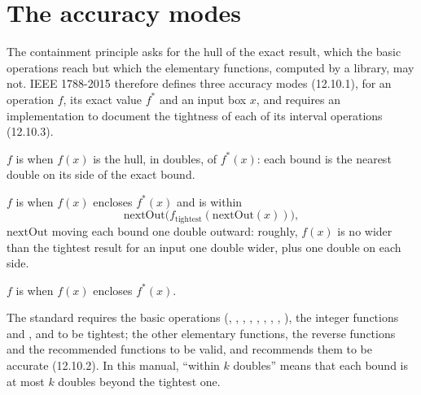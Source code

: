 \section{The accuracy modes}\label{sec:accuracy-modes}
%
%

The containment principle asks for the hull of the exact result, which the
basic operations reach but which the elementary functions, computed by a
library, may not. IEEE 1788-2015 therefore defines three accuracy modes
(12.10.1), for an operation $f$, its exact value $f^*$ and an input box
$x$, and requires an implementation to document the tightness of each of
its interval operations (12.10.3).

\begin{Def}[Tightest]\label{def:tightest}
$f$ is  when $f(x)$ is the hull, in doubles, of $f^*(x)$:
each bound is the nearest double on its side of the exact bound.
\end{Def}

\begin{Def}[Accurate]\label{def:accurate}
$f$ is  when $f(x)$ encloses $f^*(x)$ and is within
\begin{equation*}
  \mathrm{nextOut}\bigl(f_{\mathrm{tightest}}(\mathrm{nextOut}(x))\bigr),
\end{equation*}
$\mathrm{nextOut}$ moving each bound one double outward: roughly, $f(x)$
is no wider than the tightest result for an input one double wider, plus
one double on each side.
\end{Def}

\begin{Def}[Valid]\label{def:valid}
$f$ is  when $f(x)$ encloses $f^*(x)$.
\end{Def}

The standard requires the basic operations (, , ,
, , , , , ),
the integer functions and ,  and  to be
tightest; the other elementary functions, the reverse functions and the
recommended functions to be valid, and recommends them to be accurate
(12.10.2). In this manual, ``within $k$ doubles'' means that each bound is
at most $k$ doubles beyond the tightest one.

